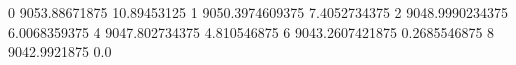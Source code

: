 0 9053.88671875 10.89453125
1 9050.3974609375 7.4052734375
2 9048.9990234375 6.0068359375
4 9047.802734375 4.810546875
6 9043.2607421875 0.2685546875
8 9042.9921875 0.0
